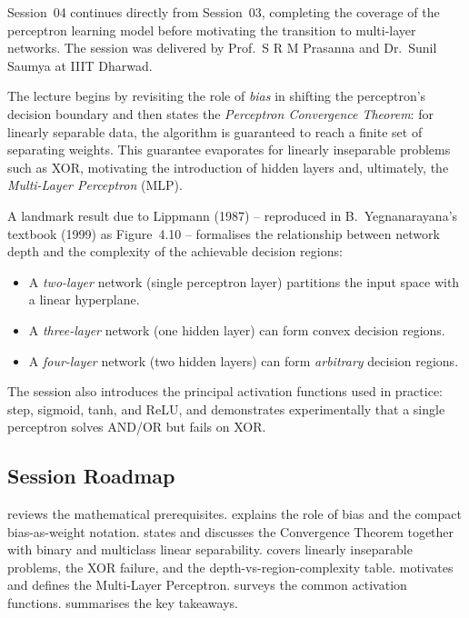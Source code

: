 \documentclass[12pt,a4paper]{article}
\begin{document}
Session~04 continues directly from Session~03, completing the coverage of
the perceptron learning model before motivating the transition to
multi-layer networks.  The session was delivered by
Prof.\ S R M Prasanna and Dr.\ Sunil Saumya at IIIT Dharwad.

The lecture begins by revisiting the role of \emph{bias} in shifting the
perceptron's decision boundary and then states the \emph{Perceptron
Convergence Theorem}: for linearly separable data, the algorithm is
guaranteed to reach a finite set of separating weights.  This guarantee
evaporates for linearly inseparable problems such as XOR, motivating the
introduction of hidden layers and, ultimately, the \emph{Multi-Layer
Perceptron} (MLP).

A landmark result due to Lippmann (1987) -- reproduced in
B.~Yegnanarayana's textbook (1999) as Figure~4.10 -- formalises the
relationship between network depth and the complexity of the achievable
decision regions:
\begin{itemize}[noitemsep]
  \item A \emph{two-layer} network (single perceptron layer) partitions
        the input space with a linear hyperplane.
  \item A \emph{three-layer} network (one hidden layer) can form convex
        decision regions.
  \item A \emph{four-layer} network (two hidden layers) can form
        \emph{arbitrary} decision regions.
\end{itemize}

The session also introduces the principal activation functions used in
practice: step, sigmoid, tanh, and ReLU, and demonstrates experimentally
that a single perceptron solves AND/OR but fails on XOR.

\subsection{Session Roadmap}
\label{subsec:roadmap}

 reviews the mathematical prerequisites.
 explains the role of bias and the compact bias-as-weight
notation.   states and discusses the Convergence
Theorem together with binary and multiclass linear separability.
 covers linearly inseparable problems, the XOR
failure, and the depth-vs-region-complexity table.
 motivates and defines the Multi-Layer
Perceptron.   surveys the common activation
functions.   summarises the key takeaways.
\end{document}
